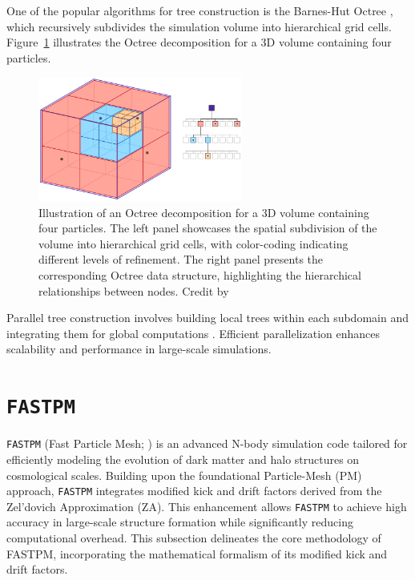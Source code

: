 One of the popular algorithms for tree construction is the Barnes-Hut Octree \citep{1986Natur.324..446B}, which recursively subdivides the simulation volume into hierarchical grid cells. Figure~\ref{fig:barnes-hut} illustrates the Octree decomposition for a 3D volume containing four particles.
\begin{figure}[ht]
    \centering
    \includegraphics[width=0.6\textwidth]{figures/Octree.png}
    \caption{Illustration of an Octree decomposition for a 3D volume containing four particles. The left panel showcases the spatial subdivision of the volume into hierarchical grid cells, with color-coding indicating different levels of refinement. The right panel presents the corresponding Octree data structure, highlighting the hierarchical relationships between nodes. Credit by \citet{Powell2023}}
    \label{fig:barnes-hut}
\end{figure}

Parallel tree construction involves building local trees within each subdomain and integrating them for global computations \citep{DUBINSKI1996133}. Efficient parallelization enhances scalability and performance in large-scale simulations.

\section{\texttt{FASTPM}} \label{sec:fastpm}
\texttt{FASTPM} (Fast Particle Mesh; \citealt{10.1093/mnras/stw2123}) is an advanced N-body simulation code tailored for efficiently modeling the evolution of dark matter and halo structures on cosmological scales. Building upon the foundational Particle-Mesh (PM) approach, \texttt{FASTPM} integrates modified kick and drift factors derived from the Zel'dovich Approximation (ZA). This enhancement allows \texttt{FASTPM} to achieve high accuracy in large-scale structure formation while significantly reducing computational overhead. This subsection delineates the core methodology of FASTPM, incorporating the mathematical formalism of its modified kick and drift factors.

